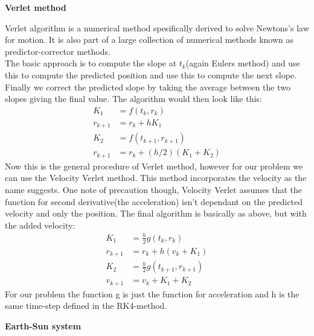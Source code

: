 \documentclass[11 pt, a4 paper]{article}
\newenvironment{tabbed}{\begin{addmargin}{0.1cm}}{\end{addmargin}}
\newcommand{\sectiontitle}[1]{\begin{center} \Large\textbf{{#1}} \end{center}}
\newcommand{\sectionundertitle}[1]{\hspace{-0.5cm} \textbf{{#1}}}
\newcommand{\vsp}{\vspace{0.2cm}}
\begin{document}
\sectionundertitle{Verlet method}
    \begin{tabbed}
        Verlet algorithm is a numerical method spesifically derived to solve Newtons's law for motion. It is also part of a large collection of numerical methods known as predictor-corrector methods.\vsp\\
        The basic approach is to compute the slope at $t_k$(again Eulers method) and use this to compute the predicted position and use this to compute the next slope. Finally we correct the predicted slope by taking the average between the two slopes giving the final value. The algorithm would then look like this:
        \begin{align*}
            K_1 &= f(t_k,r_k)\\
            r_{k+1} &= r_k + hK_1\\
            K_2 &= f(t_{k+1},r_{k+1})\\
            r_{k+1} &= r_k + (h/2)(K_1 + K_2)
        \end{align*}
        Now this is the general procedure of Verlet method, however for our problem we can use the Velocity Verlet method. This method incorporates the velocity as the name suggests. One note of precaution though, Velocity Verlet assumes that the function for second derivative(the acceleration) isn't dependant on the predicted velocity and only the position. The final algorithm is basically as above, but with the added velocity:
        \begin{align*}
            K_1 &= \frac{h}{2}g(t_k,r_k)\\
            r_{k+1} &= r_k + h(v_k + K_1)\\
            K_2 &= \frac{h}{2}g(t_{k+1},r_{k+1})\\
            v_{k+1} &= v_k + K_1 + K_2
        \end{align*}
        For our problem the function g is just the function for acceleration and h is the same time-step defined in the RK4-method.
    \end{tabbed}
\sectiontitle{Earth-Sun system}
\end{document}
